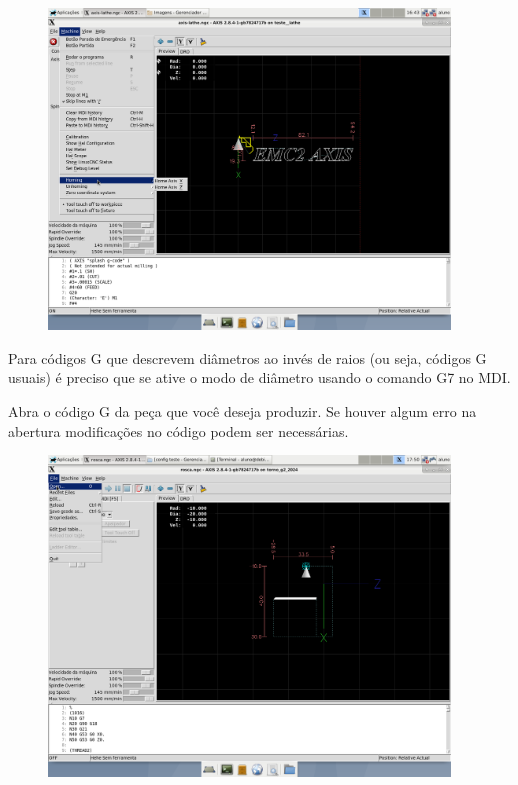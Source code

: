 \documentclass[twoside,a4paper]{refart}
\begin{document}
\begin{figure}[H]
    \begin{center}
        \includegraphics[width=0.95\textwidth]{imagens/referenciamento_linux_CNC.png}
    \end{center}
    \caption{}\label{homing}
\end{figure}


Para códigos G que descrevem diâmetros ao invés de raios (ou seja, códigos G usuais) é preciso que se ative o modo de diâmetro usando o comando G7 no MDI.

    Abra o código G da peça que você deseja produzir. Se houver algum erro na abertura modificações no código podem ser necessárias.

\begin{figure}[H]
    \begin{center}
        \includegraphics[width=0.95\textwidth]{imagens/Selecao_do_programa2.png}
    \end{center}
    \caption{}\label{progselec}
\end{figure}
\end{document}
